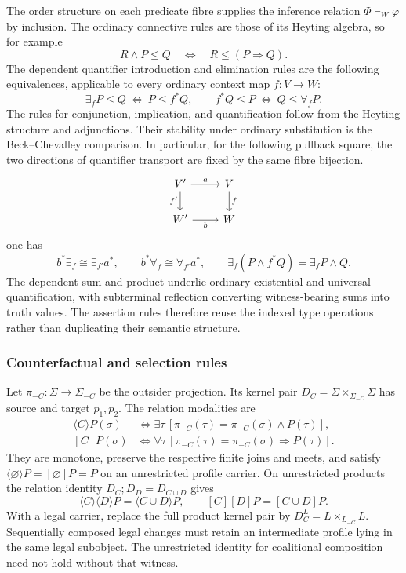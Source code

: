\documentclass[11pt,a4paper]{article}
\numberwithin{equation}{section}
\theoremstyle{definition}
\theoremstyle{remark}
\theoremstyle{plain}
\begin{document}
The order structure on each predicate fibre supplies the inference
relation $\Phi\vdash_W\varphi$ by inclusion.  The ordinary connective
rules are those of its Heyting algebra, so for example
\[
R\wedge P\leq Q\quad\Longleftrightarrow\quad
R\leq(P\Rightarrow Q).
\]
The dependent quantifier introduction and elimination rules are the
following equivalences, applicable to every ordinary context map
$f:V\to W$:
\[
\boxed{
\exists_f P\leq Q\ \Longleftrightarrow\ P\leq f^*Q,
\qquad
f^*Q\leq P\ \Longleftrightarrow\ Q\leq\forall_f P.}
\]
The rules for conjunction, implication, and quantification follow
from the Heyting structure and adjunctions. Their stability under
ordinary substitution is the Beck--Chevalley comparison. In
particular, for the following pullback square, the two directions of
quantifier transport are fixed by the same fibre bijection.
\[
\begin{tikzcd}
V'\ar[r,"a"]\ar[d,"f'"']&V\ar[d,"f"]\\
W'\ar[r,"b"']&W
\end{tikzcd}
\]
one has
\[
b^*\exists_f\cong\exists_{f'}a^*,\qquad
b^*\forall_f\cong\forall_{f'}a^*,\qquad
\exists_f(P\wedge f^*Q)=\exists_fP\wedge Q.
\]
The dependent sum and product underlie ordinary existential and
universal quantification, with subterminal reflection converting
witness-bearing sums into truth values. The assertion rules therefore
reuse the indexed type operations rather than duplicating their
semantic structure.

\subsubsection{Counterfactual and selection rules}

Let $\pi_{-C}:\Sigma\to\Sigma_{-C}$ be the outsider projection.  Its
kernel pair $D_C=\Sigma\times_{\Sigma_{-C}}\Sigma$ has source and
target $p_1,p_2$.  The relation modalities are
\[
\begin{split}
\langle C\rangle P(\sigma)&\iff
\exists\tau\,[\pi_{-C}(\tau)=\pi_{-C}(\sigma)\wedge P(\tau)],\\
[C]P(\sigma)&\iff
\forall\tau\,[\pi_{-C}(\tau)=\pi_{-C}(\sigma)
 \Rightarrow P(\tau)].
\end{split}
\]
They are monotone, preserve the respective finite joins and meets,
and satisfy $\langle\varnothing\rangle P=[\varnothing]P=P$ on an
unrestricted profile carrier.  On unrestricted products the relation
identity $D_C;D_D=D_{C\cup D}$ gives
\[
\langle C\rangle\langle D\rangle P
 =\langle C\cup D\rangle P,
\qquad
[C][D]P=[C\cup D]P.
\]
With a legal carrier, replace the full product kernel pair by
$D_C^L=L\times_{L_{-C}}L$. Sequentially composed legal changes must
retain an intermediate profile lying in the same legal subobject.
The unrestricted identity for coalitional composition need not hold
without that witness.
\end{document}
